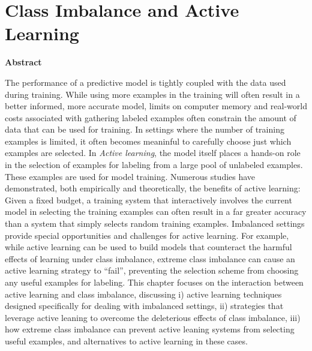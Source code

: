 \documentclass{wileySix}
\begin{document}

\chapter{Class Imbalance and Active Learning}
\date{}

\noindent\textbf{Abstract}

The performance of a predictive model is tightly coupled with the data used during training. 
While using more examples in the training will often result in a better informed, more accurate model, limits on computer memory and real-world costs associated with gathering labeled examples often constrain the amount of data that can be used for training. In settings where the number of 
training examples is limited, it often becomes meaninful to carefully choose  just which examples
are selected. In {\em Active learning}, the model itself places a hands-on role in the selection of examples for 
labeling from a large pool of unlabeled examples. These examples are used for model training. Numerous studies have demonstrated, both empirically and theoretically, the beneﬁts of active learning: Given a fixed budget, a training system that interactively involves the current model in selecting the training examples can often result in a far greater accuracy than a system that simply selects random training examples. Imbalanced settings provide special opportunities and challenges for active learning. For example, while active learning can be used to build models that counteract the harmful effects of learning under class imbalance, extreme class imbalance can cause an active learning strategy to “fail”, preventing the selection scheme from choosing any useful examples for labeling. This chapter focuses on the interaction between active
learning and class imbalance, discussing i) active learning techniques designed specifically for dealing with 
imbalanced settings, ii) strategies that leverage active leaning to overcome the deleterious effects of class imbalance, 
iii) how extreme class imbalance can prevent active leaning systems from selecting useful examples, and alternatives
to active learning in these cases. 
\end{document}
